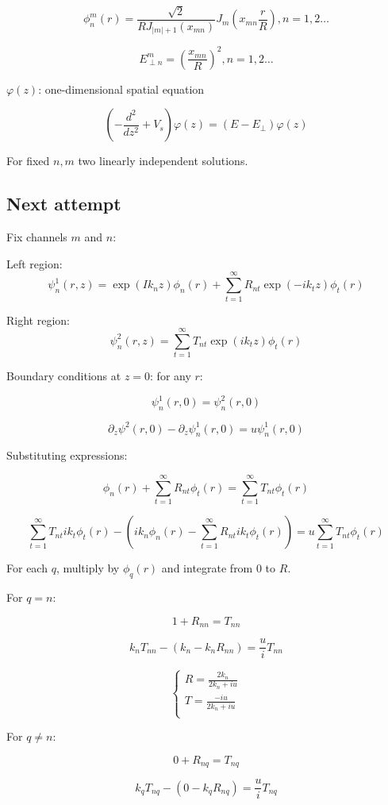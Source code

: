 \documentclass[12pt, a4paper]{article}
\begin{document}
$$\phi_n^m(r) = \frac{\sqrt{2}}{RJ_{|m| + 1}(x_{mn})}J_m(x_{mn} \frac{r}{R}), n = 1, 2 \dots$$

$$E_{\perp n}^m = \left( \frac{x_{mn}}{R} \right)^2, n = 1, 2 \dots$$

$\varphi(z)$: one-dimensional spatial equation

$$\left( -\frac{d^2}{dz^2} + V_s \right) \varphi(z) = (E - E_\perp) \varphi(z)$$

For fixed $n, m$ two linearly independent solutions.

\subsection{Next attempt}
Fix channels $m$ and $n$:

Left region:
$$\psi^1_n(r, z) = \exp(I k_n z) \phi_n(r) + \sum\limits_{t = 1}^\infty R_{nt} \exp(-i k_t z) \phi_t(r)$$

Right region:
$$\psi^2_n(r, z) = \sum\limits_{t = 1}^\infty T_{nt} \exp(i k_t z) \phi_t(r)$$


Boundary conditions at $z = 0$: for any $r$:

$$\psi_n^1(r, 0) = \psi_n^2(r, 0)$$

$$\partial_z \psi^2(r, 0) - \partial_z \psi_n^1(r, 0) = u \psi^1_n(r, 0)$$

Substituting expressions:

$$\phi_n(r) + \sum\limits_{t = 1}^\infty R_{nt} \phi_t(r) = \sum\limits_{t = 1}^\infty T_{nt} \phi_t(r)$$

$$\sum\limits_{t = 1}^\infty T_{nt} i k_t \phi_t(r) - (ik_n \phi_n(r) - \sum\limits_{t = 1}^\infty R_{nt} i k_t \phi_t(r)) =  u \sum\limits_{t = 1}^\infty T_{nt} \phi_t(r)$$

For each $q$, multiply by $\phi_q(r)$ and integrate from $0$ to $R$.

For $q = n$:

$$1 + R_{nn} = T_{nn}$$

$$k_n T_{nn} - (k_n - k_n R_{nn}) = \frac{u}{i} T_{nn}$$

$$\begin{cases}
R = \frac{2 k_n}{2 k_n + i u} \\
T = \frac{- iu}{2 k_n + iu} \\
\end{cases}$$

For $q \ne n$:

$$0 + R_{nq} = T_{nq}$$

$$k_q T_{nq} - (0 - k_q R_{nq}) = \frac{u}{i} T_{nq} $$
\end{document}
